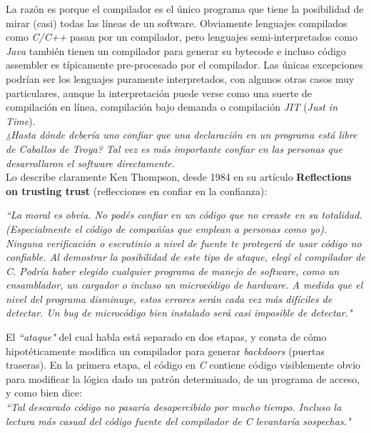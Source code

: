 La razón es porque el compilador es el único programa que tiene la posibilidad de mirar (casi) todas las líneas de un software. Obviamente lenguajes compilados como \textit{C/C++} pasan por un compilador, pero lenguajes semi-interpretados como \textit{Java} también tienen un compilador para generar su bytecode e incluso código assembler es típicamente pre-procesado por el compilador. Las únicas excepciones podrían ser los lenguajes puramente interpretados, con algunos otras casos muy particulares\cite{secenhancedcompilers}, aunque la interpretación puede verse como una suerte de compilación en línea, compilación bajo demanda o compilación \textit{JIT} (\textit{Just in Time})\cite{bolc2012design}\cite{mak2011writing}.\\

\textit{¿Hasta dónde debería uno confiar que una declaración en un programa está libre de Caballos de Troya? Tal vez es más importante confiar en las personas que desarrollaron el software directamente.}\\

Lo describe claramente Ken Thompson, desde 1984 en su artículo \textbf{Reflections on trusting trust} (reflecciones en confiar en la confianza):
\begin{displayquote}
    \textit{``La moral es obvia. No podés confiar en un código que no creaste en su totalidad. (Especialmente el código de compañías que emplean a personas como yo). Ninguna verificación o escrutinio a nivel de fuente te protegerá de usar código no confiable. Al demostrar la posibilidad de este tipo de ataque, elegí el compilador de C. Podría haber elegido cualquier programa de manejo de software, como un ensamblador, un cargador o incluso un microcódigo de hardware. A medida que el nivel del programa disminuye, estos errores serán cada vez más difíciles de detectar. Un bug de microcódigo bien instalado será casi imposible de detectar."}
\end{displayquote}

El \textit{``ataque"} del cual habla está separado en dos etapas, y consta de cómo hipotéticamente modifica un compilador para generar \textit{backdoors} (puertas traseras). En la primera etapa, el código en \textit{C} contiene código visiblemente obvio para modificar la lógica dado un patrón determinado, de un programa de acceso, y como bien dice:\\

\textit{``Tal descarado código no pasaría desapercibido por mucho tiempo. Incluso la lectura más casual del código fuente del compilador de C levantaría sospechas."}\\

